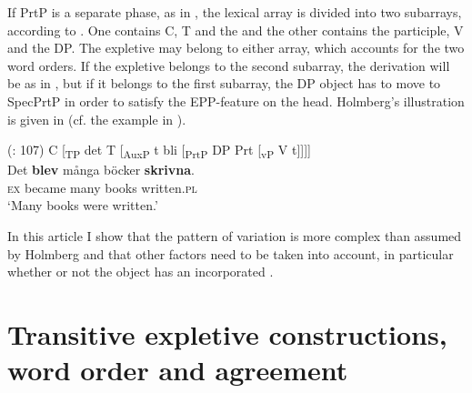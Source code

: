 \documentclass[output=paper]{LSP/langsci}
\begin{document}
\noindent If PrtP is a separate phase, as in , the lexical array is divided into two subarrays, according to \citet[106]{Holmberg2002Expletives}. One contains C, T and the  and the other contains the participle, V and the DP. The expletive may belong to either array, which accounts for the two word orders. If the expletive belongs to the second subarray, the derivation will be as in , but if it belongs to the first subarray, the DP object has to move to SpecPrtP in order to satisfy the EPP-feature on the head. Holmberg’s illustration is given in  (cf. the  example in ).


\ea%
    \label{ex:engdahl:6}
     (\citealt{Holmberg2002Expletives}: 107)
\ea \label{ex:engdahl:6a}
C [\textsubscript{TP} det T [\textsubscript{AuxP} t bli [\textsubscript{PrtP} DP Prt [\textsubscript{vP} V t]]]]\\
\ex \label{ex:engdahl:6b}
\gll Det  \textbf{blev} många  böcker    \textbf{skrivna}.\\
   \textsc{ex}    became  many  books    written\textsc{.pl}\\
\glt ‘Many books were written.'
\z
\z


\noindent In this article I show that the pattern of variation is more complex than assumed by Holmberg and that other factors need to be taken into account, in particular whether or not the object has an incorporated .

\section{Transitive expletive constructions, word order and agreement}%
\end{document}
